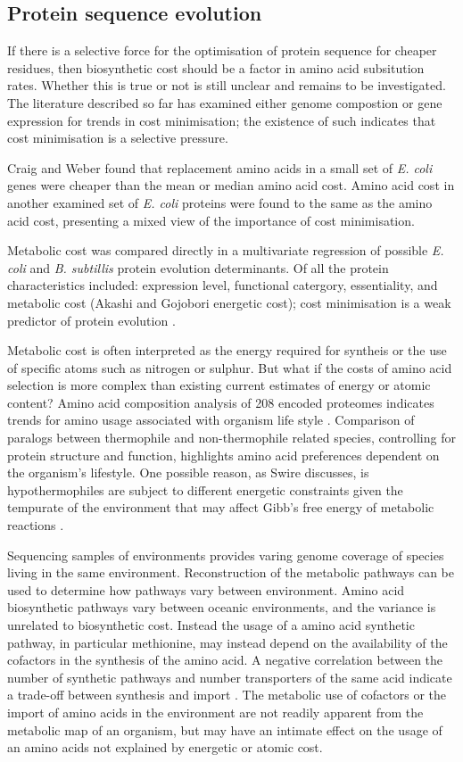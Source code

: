 \subsection{Protein sequence evolution}

If there is a selective force for the optimisation of protein sequence for cheaper residues, then biosynthetic cost should be a factor in amino acid subsitution rates. Whether this is true or not is still unclear and remains to be investigated. The literature described so far has examined either genome compostion or gene expression for trends in cost minimisation; the existence of such indicates that cost minimisation is a selective pressure.

Craig and Weber \cite{craig1998} found that replacement amino acids in a small set of \emph{E. coli} genes were cheaper than the mean or median amino acid cost. Amino acid cost in another examined set of \emph{E. coli} proteins were found to the same as the amino acid cost, presenting a mixed view of the importance of cost minimisation.

Metabolic cost was compared directly in a multivariate regression of possible \emph{E. coli} and \emph{B. subtillis} protein evolution determinants. Of all the protein characteristics included: expression level, functional catergory, essentiality, and metabolic cost (Akashi and Gojobori energetic cost\cite{akashi2002}); cost minimisation is a weak predictor of protein evolution \cite{rocha2004}.

Metabolic cost is often interpreted as the energy required for syntheis or the use of specific atoms such as nitrogen or sulphur. But what if the costs of amino acid selection is more complex than existing current estimates of energy or atomic content? Amino acid composition analysis of 208 encoded proteomes indicates trends for amino usage associated with organism life style \cite{tekaia2006}. Comparison of paralogs between thermophile and non-thermophile related species, controlling for protein structure and function, highlights amino acid preferences dependent on the organism's lifestyle. One possible reason, as Swire discusses, is hypothermophiles are subject to different energetic constraints given the tempurate of the environment that may affect Gibb's free energy of metabolic reactions \cite{swire2007}.

Sequencing samples of environments provides varing genome coverage of species living in the same environment. Reconstruction of the metabolic pathways can be used to determine how pathways vary between environment. Amino acid biosynthetic pathways vary between oceanic environments, and the variance is unrelated to biosynthetic cost. Instead the usage of a amino acid synthetic pathway, in particular methionine, may instead depend on the availability of the cofactors in the synthesis of the amino acid. A negative correlation between the number of synthetic pathways and number transporters of the same acid indicate a trade-off between synthesis and import \cite{gianoulis2009}. The metabolic use of cofactors or the import of amino acids in the environment are not readily apparent from the metabolic map of an organism, but may have an intimate effect on the usage of an amino acids not explained by energetic or atomic cost.

